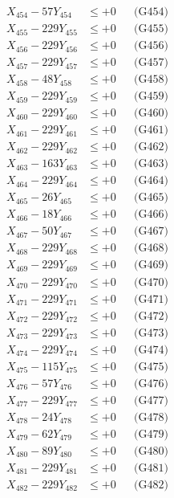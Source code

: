 \documentclass[a4paper,10pt]{article}
\begin{document}
{\begin{align}
X_{454} - 57Y_{454} &\leq +0 && \text{(G454)} \\
X_{455} - 229Y_{455} &\leq +0 && \text{(G455)} \\
X_{456} - 229Y_{456} &\leq +0 && \text{(G456)} \\
X_{457} - 229Y_{457} &\leq +0 && \text{(G457)} \\
X_{458} - 48Y_{458} &\leq +0 && \text{(G458)} \\
X_{459} - 229Y_{459} &\leq +0 && \text{(G459)} \\
X_{460} - 229Y_{460} &\leq +0 && \text{(G460)} \\
\allowbreak
X_{461} - 229Y_{461} &\leq +0 && \text{(G461)} \\
X_{462} - 229Y_{462} &\leq +0 && \text{(G462)} \\
X_{463} - 163Y_{463} &\leq +0 && \text{(G463)} \\
X_{464} - 229Y_{464} &\leq +0 && \text{(G464)} \\
X_{465} - 26Y_{465} &\leq +0 && \text{(G465)} \\
X_{466} - 18Y_{466} &\leq +0 && \text{(G466)} \\
X_{467} - 50Y_{467} &\leq +0 && \text{(G467)} \\
X_{468} - 229Y_{468} &\leq +0 && \text{(G468)} \\
X_{469} - 229Y_{469} &\leq +0 && \text{(G469)} \\
X_{470} - 229Y_{470} &\leq +0 && \text{(G470)} \\
\allowbreak
X_{471} - 229Y_{471} &\leq +0 && \text{(G471)} \\
X_{472} - 229Y_{472} &\leq +0 && \text{(G472)} \\
X_{473} - 229Y_{473} &\leq +0 && \text{(G473)} \\
X_{474} - 229Y_{474} &\leq +0 && \text{(G474)} \\
X_{475} - 115Y_{475} &\leq +0 && \text{(G475)} \\
X_{476} - 57Y_{476} &\leq +0 && \text{(G476)} \\
X_{477} - 229Y_{477} &\leq +0 && \text{(G477)} \\
X_{478} - 24Y_{478} &\leq +0 && \text{(G478)} \\
X_{479} - 62Y_{479} &\leq +0 && \text{(G479)} \\
X_{480} - 89Y_{480} &\leq +0 && \text{(G480)} \\
\allowbreak
X_{481} - 229Y_{481} &\leq +0 && \text{(G481)} \\
X_{482} - 229Y_{482} &\leq +0 && \text{(G482)} \\

\end{align}}
\end{document}
